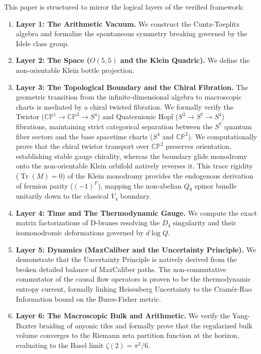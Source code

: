 \documentclass[11pt,a4paper]{article}
\begin{document}
This paper is structured to mirror the logical layers of the verified framework:
\begin{enumerate}
    \item \textbf{Layer 1: The Arithmetic Vacuum.} We construct the Cuntz-Toeplitz algebra and formalize the spontaneous symmetry breaking governed by the Idele class group.
    \item \textbf{Layer 2: The Space ($O(5,5)$ and the Klein Quadric).} We define the non-orientable Klein bottle projection.
    \item \textbf{Layer 3: The Topological Boundary and the Chiral Fibration.} The geometric transition from the infinite-dimensional algebra to macroscopic charts is mediated by a chiral twisted fibration. We formally verify the Twistor ($\mathbb{CP}^1 \to \mathbb{CP}^3 \to S^4$) and Quaternionic Hopf ($S^3 \to S^7 \to S^4$) fibrations, maintaining strict categorical separation between the $S^7$ quantum fiber sectors and the base spacetime charts ($S^4$ and $\mathbb{CP}^2$). We computationally prove that the chiral twistor transport over $\mathbb{CP}^2$ preserves orientation, establishing stable gauge chirality, whereas the boundary glide monodromy onto the non-orientable Klein orbifold natively reverses it. This trace rigidity ($\operatorname{Tr}(M) = 0$) of the Klein monodromy provides the endogenous derivation of fermion parity ($(-1)^F$), mapping the non-abelian $Q_8$ spinor bundle unitarily down to the classical $V_4$ boundary.
    \item \textbf{Layer 4: Time and The Thermodynamic Gauge.} We compute the exact matrix factorizations of D-branes resolving the $D_4$ singularity and their isomonodromic deformations governed by $d\log Q$.
    \item \textbf{Layer 5: Dynamics (MaxCaliber and the Uncertainty Principle).} We demonstrate that the Uncertainty Principle is natively derived from the broken detailed balance of MaxCaliber paths. The non-commutative commutator of the causal flow operators is proven to be the thermodynamic entropy current, formally linking Heisenberg Uncertainty to the Cram\'er-Rao Information bound on the Bures-Fisher metric.
    \item \textbf{Layer 6: The Macroscopic Bulk and Arithmetic.} We verify the Yang-Baxter braiding of anyonic tiles and formally prove that the regularized bulk volume converges to the Riemann zeta partition function at the horizon, evaluating to the Basel limit $\zeta(2) = \pi^2/6$.
\end{enumerate}
\end{document}
